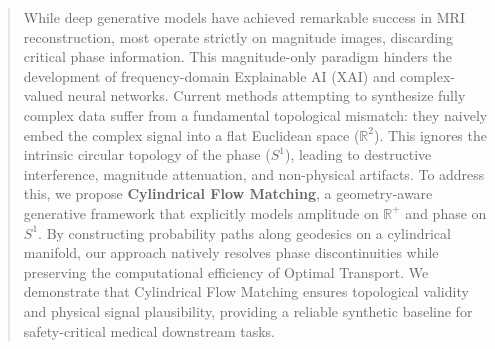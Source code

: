 \begin{abstract}
While deep generative models have achieved remarkable success in MRI reconstruction, most operate strictly on magnitude images, discarding critical phase information. This magnitude-only paradigm hinders the development of frequency-domain Explainable AI (XAI) and complex-valued neural networks. Current methods attempting to synthesize fully complex data suffer from a fundamental topological mismatch: they naively embed the complex signal into a flat Euclidean space ($\mathbb{R}^2$). This ignores the intrinsic circular topology of the phase ($S^1$), leading to destructive interference, magnitude attenuation, and non-physical artifacts. To address this, we propose \textbf{Cylindrical Flow Matching}, a geometry-aware generative framework that explicitly models amplitude on $\mathbb{R}^+$ and phase on $S^1$. By constructing probability paths along geodesics on a cylindrical manifold, our approach natively resolves phase discontinuities while preserving the computational efficiency of Optimal Transport. We demonstrate that Cylindrical Flow Matching ensures topological validity and physical signal plausibility, providing a reliable synthetic baseline for safety-critical medical downstream tasks.
\end{abstract}
